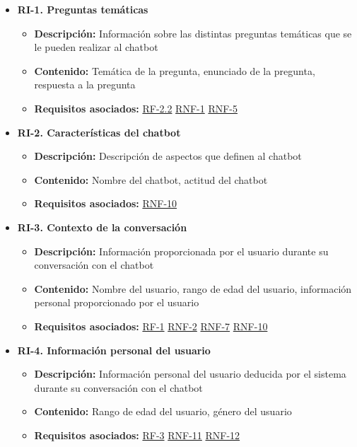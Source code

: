 \begin{itemize}
    \item \textbf{RI-1. Preguntas temáticas} \label{RI-1}
    \begin{itemize}
        \item \textbf{Descripción:} Información sobre las distintas preguntas temáticas que se le pueden realizar al chatbot
        \item \textbf{Contenido:} Temática de la pregunta, enunciado de la pregunta, respuesta a la pregunta
        \item \textbf{Requisitos asociados:} \hyperref[RF-2.2]{RF-2.2} \hyperref[RNF-1]{RNF-1} \hyperref[RNF-5]{RNF-5}
    \end{itemize}
    
    \item \textbf{RI-2. Características del chatbot} \label{RI-2}
    \begin{itemize}
        \item \textbf{Descripción:} Descripción de aspectos que definen al chatbot
        \item \textbf{Contenido:} Nombre del chatbot, actitud del chatbot
        \item \textbf{Requisitos asociados:} \hyperref[RNF-10]{RNF-10}
    \end{itemize}
    
    \item \textbf{RI-3. Contexto de la conversación} \label{RI-3}
    \begin{itemize}
        \item \textbf{Descripción:} Información proporcionada por el usuario durante su conversación con el chatbot
        \item \textbf{Contenido:} Nombre del usuario, rango de edad del usuario, información personal proporcionado por el usuario
        \item \textbf{Requisitos asociados:} \hyperref[RF-1]{RF-1} \hyperref[RNF-2]{RNF-2} \hyperref[RNF-7]{RNF-7} \hyperref[RNF-10]{RNF-10}
    \end{itemize}
    
    \item \textbf{RI-4. Información personal del usuario} \label{RI-4}
    \begin{itemize}
        \item \textbf{Descripción:} Información personal del usuario deducida por el sistema durante su conversación con el chatbot
        \item \textbf{Contenido:} Rango de edad del usuario, género del usuario
        \item \textbf{Requisitos asociados:} \hyperref[RF-3]{RF-3} \hyperref[RNF-11]{RNF-11} \hyperref[RNF-12]{RNF-12}
    \end{itemize}
\end{itemize}


